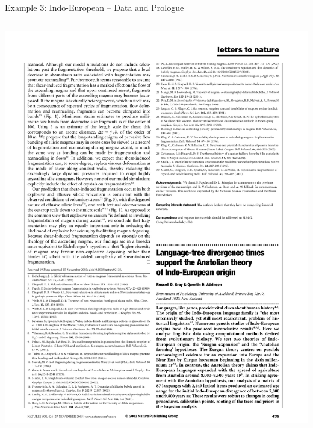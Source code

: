 \documentclass[9pt]{beamer}
\begin{document}
\begin{frame}{Example 3: Indo-European – Data and Prologue}
\begin{columns}
\begin{column}{0.5\textwidth}
      \footnotemark\includegraphics[width=\textwidth,page=3,trim={2.2cm 4.6cm 2.7cm 5.0cm},clip]{gray2003language.pdf}
    \end{column}
  \end{columns}
\end{frame}
\end{document}

